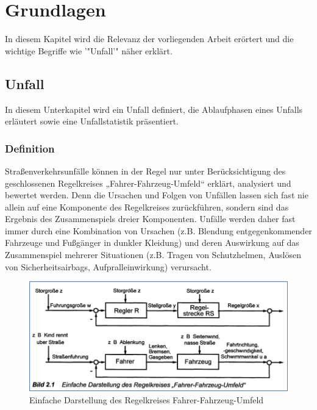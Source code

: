 \chapter{Grundlagen}
In diesem Kapitel wird die Relevanz der vorliegenden Arbeit erörtert und die wichtige Begriffe wie '"Unfall'" näher erklärt.

%
%
\section{Unfall}
In diesem Unterkapitel wird ein Unfall definiert, die Ablaufphasen eines Unfalls erläutert sowie eine Unfallstatistik präsentiert.
%
%
%
%
\subsection{Definition}
Straßenverkehrsunfälle können in der Regel nur unter Berücksichtigung des geschlossenen Regelkreises „Fahrer-Fahrzeug-Umfeld“ erklärt, analysiert und bewertet werden. Denn die Ursachen und Folgen von Unfällen lassen sich fast nie allein auf eine Komponente des Regelkreises zurückführen, sondern sind das Ergebnis des Zusammenspiels dreier Komponenten. Unfälle werden daher fast immer durch eine Kombination von Ursachen (z.B. Blendung entgegenkommender Fahrzeuge und Fußgänger in dunkler Kleidung) und deren Auswirkung auf das Zusammenspiel mehrerer Situationen (z.B. Tragen von Schutzhelmen, Auslösen von Sicherheitsairbags, Aufpralleinwirkung) verursacht. \citep{Appel2002}

\begin{figure}
	\centering
	\includegraphics[width=\linewidth]{Bilder/FahrenRegelkreis.png}
	\caption{Einfache Darstellung des Regelkreises 	\glq Fahrer-Fahrzeug-Umfeld\grq \citep{Appel2002}} %
	\label{fig:FahrenRegelkreis}
\end{figure}

